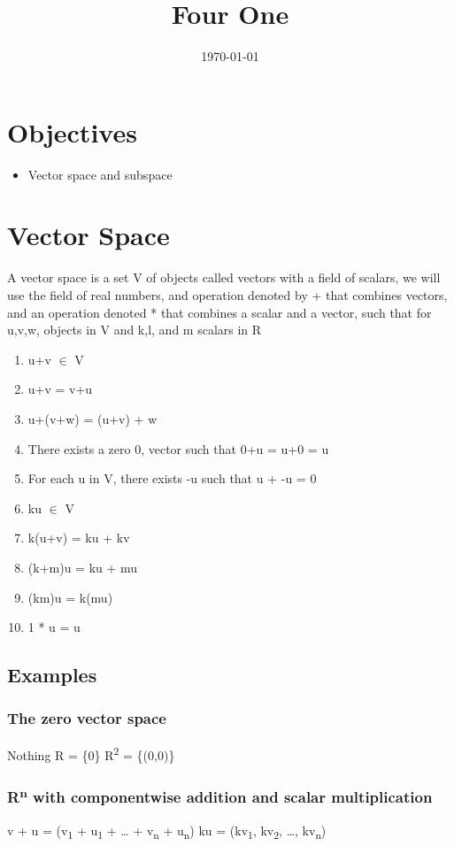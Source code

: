 \documentclass[11pt]{article}
\date{\today}
\title{Four One}
\begin{document}
\maketitle
\tableofcontents

\section{Objectives}
\label{sec:org3b5020d}
\begin{itemize}
\item Vector space and subspace
\end{itemize}
\section{Vector Space}
\label{sec:orga7460d0}
A vector space is a set V of objects called vectors with a field of scalars, we will use the field of real numbers, and operation denoted by + that combines vectors, and an operation denoted * that combines a scalar and a vector, such that for u,v,w, objects in V and k,l, and m scalars in R
\begin{enumerate}
\item u+v \(\in\) V
\item u+v = v+u
\item u+(v+w) = (u+v) + w
\item There exists a zero 0, vector such that 0+u = u+0 = u
\item For each u in V, there exists -u such that u + -u = 0
\item ku \(\in\) V
\item k(u+v) = ku + kv
\item (k+m)u = ku + mu
\item (km)u = k(mu)
\item 1 * u = u
\end{enumerate}
\subsection{Examples}
\label{sec:orgca4e6ac}
\subsubsection{The zero vector space}
\label{sec:org08613bd}
Nothing
R = \{0\}
R\textsuperscript{2} = \{(0,0)\}
\subsubsection{R\textsuperscript{n} with componentwise addition and scalar multiplication}
\label{sec:org386c9fe}
v + u = (v\textsubscript{1} + u\textsubscript{1} + \ldots{} + v\textsubscript{n} + u\textsubscript{n})
ku = (kv\textsubscript{1}, kv\textsubscript{2}, \ldots{}, kv\textsubscript{n})
\end{document}

